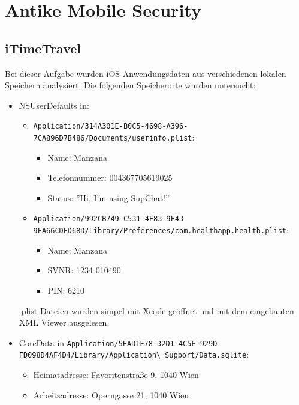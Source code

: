 \documentclass[12pt, a4paper, titlepage, oneside]{scrartcl}
\begin{document}
	\newpage

	\section{Antike Mobile Security}

	\subsection{iTimeTravel}
	Bei dieser Aufgabe wurden iOS-Anwendungsdaten aus verschiedenen lokalen
	Speichern analysiert. Die folgenden Speicherorte wurden untersucht:

	\begin{itemize}
		\item NSUserDefaults in:
			\begin{itemize}
				\item \lstinline{Application/314A301E-B0C5-4698-A396-7CA896D7B486/Documents/userinfo.plist}:
					\begin{itemize}
						\item Name: Manzana

						\item Telefonnummer: 004367705619025

						\item Status: ''Hi, I'm using SupChat!''
					\end{itemize}

				\item \lstinline{Application/992CB749-C531-4E83-9F43-9FA66CDFD68D/Library/Preferences/com.healthapp.health.plist}:
					\begin{itemize}
						\item Name: Manzana

						\item SVNR: 1234 010490

						\item PIN: 6210
					\end{itemize}
			\end{itemize}
			.plist Dateien wurden simpel mit Xcode geöffnet und mit dem eingebauten XML
			Viewer ausgelesen.

		\item CoreData in \lstinline{Application/5FAD1E78-32D1-4C5F-929D-FD098D4AF4D4/Library/Application\ Support/Data.sqlite}:
			\begin{itemize}
				\item Heimatadresse: Favoritenstraße 9, 1040 Wien

				\item Arbeitsadresse: Operngasse 21, 1040 Wien


\end{itemize}
\end{itemize}
\end{document}
